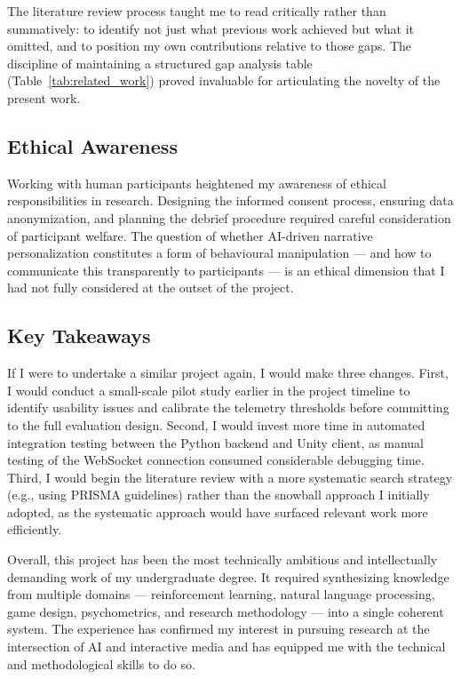 \documentclass[12pt,a4paper]{report}
\begin{document}
The literature review process taught me to read critically rather than summatively: to identify not just what previous work achieved but what it omitted, and to position my own contributions relative to those gaps. The discipline of maintaining a structured gap analysis table (Table~\ref{tab:related_work}) proved invaluable for articulating the novelty of the present work.

\subsection{Ethical Awareness}

Working with human participants heightened my awareness of ethical responsibilities in research. Designing the informed consent process, ensuring data anonymization, and planning the debrief procedure required careful consideration of participant welfare. The question of whether AI-driven narrative personalization constitutes a form of behavioural manipulation --- and how to communicate this transparently to participants --- is an ethical dimension that I had not fully considered at the outset of the project.

\subsection{Key Takeaways}

If I were to undertake a similar project again, I would make three changes. First, I would conduct a small-scale pilot study earlier in the project timeline to identify usability issues and calibrate the telemetry thresholds before committing to the full evaluation design. Second, I would invest more time in automated integration testing between the Python backend and Unity client, as manual testing of the WebSocket connection consumed considerable debugging time. Third, I would begin the literature review with a more systematic search strategy (e.g., using PRISMA guidelines) rather than the snowball approach I initially adopted, as the systematic approach would have surfaced relevant work more efficiently.

Overall, this project has been the most technically ambitious and intellectually demanding work of my undergraduate degree. It required synthesizing knowledge from multiple domains --- reinforcement learning, natural language processing, game design, psychometrics, and research methodology --- into a single coherent system. The experience has confirmed my interest in pursuing research at the intersection of AI and interactive media and has equipped me with the technical and methodological skills to do so.
\end{document}
